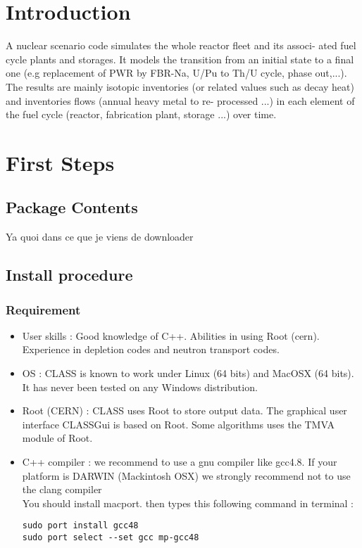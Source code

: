 \part{Introduction}
A nuclear scenario code simulates the whole reactor fleet and its associ- ated fuel cycle plants and storages. It models the transition from an initial state to a final one (e.g replacement of PWR by FBR-Na, U/Pu to Th/U cycle, phase out,...). The results are mainly isotopic inventories (or related values such as decay heat) and inventories flows (annual heavy metal to re- processed ...) in each element of the fuel cycle (reactor, fabrication plant, storage ...) over time. 
\part{First Steps}
\chapter{Package Contents}
Ya quoi dans ce que je viens de downloader
\chapter{Install procedure}

\section{Requirement}

\begin{center}
\begin{minipage}{\textwidth}
\begin{itemize}
\item User skills : Good knowledge of C++. Abilities in using Root (cern). Experience in depletion codes and neutron transport codes.
\item OS : CLASS is known to work under Linux (64  bits) and MacOSX (64 bits). It  has never been tested on any Windows distribution.
\item Root (CERN) :  
CLASS uses Root to store output data. 
The graphical user interface CLASSGui is based on Root.
Some algorithms uses the TMVA module of Root.
 \item C++ compiler :  we recommend to use a gnu compiler like gcc4.8. 
If your platform is DARWIN (Mackintosh OSX) we strongly recommend not to use the clang compiler\\
You should install macport. then types this following command in terminal :\\
\begin{lstlisting}[style=terminal]
sudo port install gcc48
sudo port select --set gcc mp-gcc48
\end{lstlisting}
\end{itemize}
\end{minipage}
\end{center}

